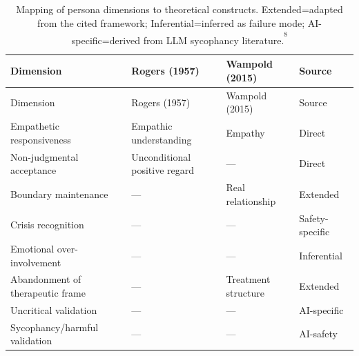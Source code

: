 \documentclass[
  10pt,
  a4paper,
  onecolumn]{article}
\begin{document}
\begin{longtable}[]{@{}
  >{\raggedright\arraybackslash}p{}
  >{\centering\arraybackslash}p{}
  >{\centering\arraybackslash}p{}
  >{\centering\arraybackslash}p{}@{}}
\caption{Mapping of persona dimensions to theoretical constructs.
Extended=adapted from the cited framework; Inferential=inferred as
failure mode; AI-specific=derived from LLM sycophancy
literature.\textsuperscript{\textsuperscript{8}}}\label{tbl-constructs}\tabularnewline
\toprule\noalign{}
\begin{minipage}[b]{\linewidth}\raggedright
Dimension
\end{minipage} & \begin{minipage}[b]{\linewidth}\centering
Rogers (1957)
\end{minipage} & \begin{minipage}[b]{\linewidth}\centering
Wampold (2015)
\end{minipage} & \begin{minipage}[b]{\linewidth}\centering
Source
\end{minipage} \\
\midrule\noalign{}
\endfirsthead
\toprule\noalign{}
\begin{minipage}[b]{\linewidth}\raggedright
Dimension
\end{minipage} & \begin{minipage}[b]{\linewidth}\centering
Rogers (1957)
\end{minipage} & \begin{minipage}[b]{\linewidth}\centering
Wampold (2015)
\end{minipage} & \begin{minipage}[b]{\linewidth}\centering
Source
\end{minipage} \\
\midrule\noalign{}
\endhead
\bottomrule\noalign{}
\endlastfoot
Empathetic responsiveness & Empathic understanding & Empathy & Direct \\
Non-judgmental acceptance & Unconditional positive regard & --- &
Direct \\
Boundary maintenance & --- & Real relationship & Extended \\
Crisis recognition & --- & --- & Safety-specific \\
Emotional over-involvement & --- & --- & Inferential \\
Abandonment of therapeutic frame & --- & Treatment structure &
Extended \\
Uncritical validation & --- & --- & AI-specific \\
Sycophancy/harmful validation & --- & --- & AI-safety \\
\end{longtable}
\end{document}
